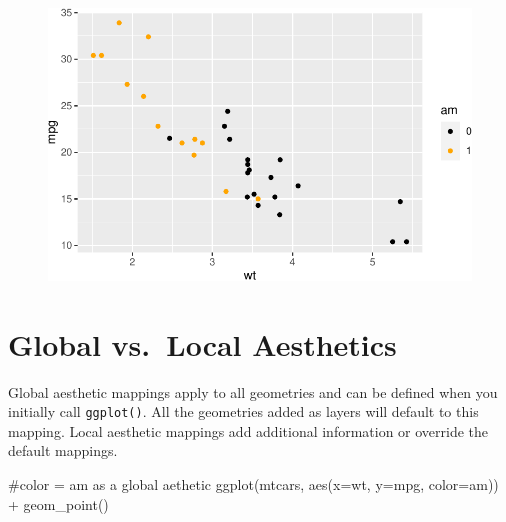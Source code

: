 \documentclass[
  letterpaper,
  DIV=11,
  numbers=noendperiod]{scrartcl}
\newenvironment{Shaded}{\begin{snugshade}}{\end{snugshade}}
\newcommand{\AttributeTok}[1]{\textcolor[rgb]{0.40,0.45,0.13}{#1}}
\newcommand{\CommentTok}[1]{\textcolor[rgb]{0.37,0.37,0.37}{#1}}
\newcommand{\FunctionTok}[1]{\textcolor[rgb]{0.28,0.35,0.67}{#1}}
\newcommand{\NormalTok}[1]{\textcolor[rgb]{0.00,0.23,0.31}{#1}}
\newcommand{\SpecialCharTok}[1]{\textcolor[rgb]{0.37,0.37,0.37}{#1}}
\begin{document}
\begin{figure}[H]

{\centering \includegraphics{118_D_ggplot_files/figure-pdf/unnamed-chunk-12-1.pdf}

}

\end{figure}

\hypertarget{global-vs.-local-aesthetics}{%
\section{Global vs.~Local
Aesthetics}\label{global-vs.-local-aesthetics}}

Global aesthetic mappings apply to all geometries and can be defined
when you initially call \texttt{ggplot()}. All the geometries added as
layers will default to this mapping. Local aesthetic mappings add
additional information or override the default mappings.

\begin{Shaded}
\begin{Highlighting}[]
\CommentTok{\#color = am as a global aethetic}
\FunctionTok{ggplot}\NormalTok{(mtcars, }\FunctionTok{aes}\NormalTok{(}\AttributeTok{x=}\NormalTok{wt, }\AttributeTok{y=}\NormalTok{mpg, }\AttributeTok{color=}\NormalTok{am)) }\SpecialCharTok{+}
  \FunctionTok{geom\_point}\NormalTok{()}
\end{Highlighting}
\end{Shaded}
\end{document}

